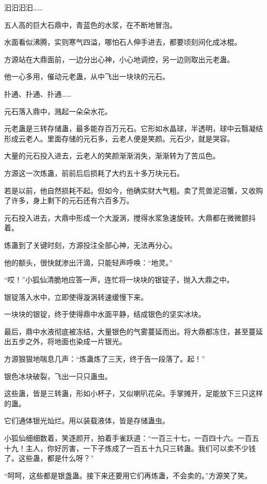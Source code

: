 
\begin{this_body}

汩汩汩汩……

五人高的巨大石鼎中，青蓝色的水浆，在不断地冒泡。

水面看似沸腾，实则寒气四溢，哪怕石人伸手进去，都要顷刻间化成冰棍。

方源站在大鼎面前，一边分出心神，小心地调控，另一边则取出元老蛊。

他一心多用，催动元老蛊，从中飞出一块块的元石。

扑通、扑通、扑通……

元石落入鼎中，溅起一朵朵水花。

元老蛊是三转存储蛊，最多能存百万元石。它形如水晶球，半透明，球中云翳凝结形成云老人。里面存储的元石多，云老人便是笑颜。元石少，就是哭容。

大量的元石投入进去，云老人的笑颜渐渐消失，渐渐转为了苦瓜色。

方源这一次炼蛊，前前后后损耗了大约五十多万块元石。

若是以前，他自然损耗不起。但如今，他确实财大气粗。卖了荒兽泥沼蟹，又收购了许多，身上剩下的元石还有六百多万。

元石投入进去，大鼎中形成一个大漩涡，搅得水浆急速旋转。大鼎都在微微颤抖着。

炼蛊到了关键时刻，方源投注全部心神，无法再分心。

他的额头，很快就渗出汗滴，只能轻声呼唤：“地灵。”

“哎！”小狐仙清脆地应答一声，连忙将一块块的银锭子，抛入大鼎之中。

银锭落入水中，立即使得漩涡转速缓慢下来。

一块块的银锭，终于使得鼎中水面平静，结成银色的坚实冰块。

最后，鼎中水液彻底被冻结，大量银色的气雾蔓延而出。将大鼎都冻住，甚至蔓延出五步之外，将地面也染成一片银光。

方源狠狠地喘息几声：“炼蛊炼了三天，终于告一段落了。起！”

银色冰块破裂，飞出一只只蛊虫。

这些蛊，皆是三转蛊，形如小杯子，又似喇叭花朵。手掌摊开，足能放下三只这样的蛊。

它们通体银光灿烂。用以装载液体，皆是存储蛊虫。

小狐仙细细数着，笑逐颜开，拍着手雀跃道：“一百三十七，一百四十六。一百五十九！主人，你好厉害，一下子炼成了一百五十九只三转蛊。我们可以卖不少钱了。这些蛊，都是什么呀？”

“呵呵，这些都是银盏蛊。接下来还要用它们再炼蛊，不会卖的。”方源笑了笑。


\end{this_body}
